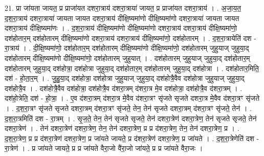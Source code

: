 \documentclass[17pt]{extarticle}
\begin{document}
21. प्रा जा॑यता जायत॒ प्र प्राजा॑यत दशरा॒त्राय॑ दशरा॒त्राया॑ जायत॒ प्र प्राजा॑यत दशरा॒त्राय॑ । . अ॒जा॒य॒त॒ द॒श॒रा॒त्राय॑ दशरा॒त्राया॑ जायता जायत दशरा॒त्राय॑ दीक्षि॒ष्यमा॑णो दीक्षि॒ष्यमा॑णो दशरा॒त्राया॑ जायता जायत दशरा॒त्राय॑ दीक्षि॒ष्यमा॑णः । . द॒श॒रा॒त्राय॑ दीक्षि॒ष्यमा॑णो दीक्षि॒ष्यमा॑णो दशरा॒त्राय॑ दशरा॒त्राय॑ दीक्षि॒ष्यमा॑णो॒ दश॑होतार॒म् दश॑होतारम् दीक्षि॒ष्यमा॑णो दशरा॒त्राय॑ दशरा॒त्राय॑ दीक्षि॒ष्यमा॑णो॒ दश॑होतारम् । . द॒श॒रा॒त्रायेति॑ दश - रा॒त्राय॑ । . दी॒क्षि॒ष्यमा॑णो॒ दश॑होतार॒म् दश॑होतारम् दीक्षि॒ष्यमा॑णो दीक्षि॒ष्यमा॑णो॒ दश॑होतारम् जुहुयाज् जुहुया॒द् दश॑होतारम् दीक्षि॒ष्यमा॑णो दीक्षि॒ष्यमा॑णो॒ दश॑होतारम् जुहुयात् । . दश॑होतारम् जुहुयाज् जुहुया॒द् दश॑होतार॒म् दश॑होतारम् जुहुया॒द् दश॑होत्रा॒ दश॑होत्रा जुहुया॒द् दश॑होतार॒म् दश॑होतारम् जुहुया॒द् दश॑होत्रा । . दश॑होतार॒मिति॒ दश॑ - हो॒ता॒र॒म् । . जु॒हु॒या॒द् दश॑होत्रा॒ दश॑होत्रा जुहुयाज् जुहुया॒द् दश॑होत्रै॒वैव दश॑होत्रा जुहुयाज् जुहुया॒द् दश॑होत्रै॒व । . दश॑होत्रै॒वैव दश॑होत्रा॒ दश॑होत्रै॒व द॑शरा॒त्रम् द॑शरा॒त्र मे॒व दश॑होत्रा॒ दश॑होत्रै॒व द॑शरा॒त्रम् । . दश॑हो॒त्रेति॒ दश॑ - हो॒त्रा॒ । . ए॒व द॑शरा॒त्रम् द॑शरा॒त्र मे॒वैव द॑शरा॒त्रꣳ सृ॑जते सृजते दशरा॒त्र मे॒वैव द॑शरा॒त्रꣳ सृ॑जते । . द॒श॒रा॒त्रꣳ सृ॑जते सृजते दशरा॒त्रम् द॑शरा॒त्रꣳ सृ॑जते॒ तेन॒ तेन॑ सृजते दशरा॒त्रम् द॑शरा॒त्रꣳ सृ॑जते॒ तेन॑ । . द॒श॒रा॒त्रमिति॑ दश - रा॒त्रम् । . सृ॒ज॒ते॒ तेन॒ तेन॑ सृजते सृजते॒ तेन॑ दशरा॒त्रेण॑ दशरा॒त्रेण॒ तेन॑ सृजते सृजते॒ तेन॑ दशरा॒त्रेण॑ । . तेन॑ दशरा॒त्रेण॑ दशरा॒त्रेण॒ तेन॒ तेन॑ दशरा॒त्रेण॒ प्र प्र द॑शरा॒त्रेण॒ तेन॒ तेन॑ दशरा॒त्रेण॒ प्र । . द॒श॒रा॒त्रेण॒ प्र प्र द॑शरा॒त्रेण॑ दशरा॒त्रेण॒ प्र जा॑यते जायते॒ प्र द॑शरा॒त्रेण॑ दशरा॒त्रेण॒ प्र जा॑यते । . द॒श॒रा॒त्रेणेति॑ दश - रा॒त्रेण॑ । . प्र जा॑यते जायते॒ प्र प्र जा॑यते वैरा॒जो वै॑रा॒जो जा॑यते॒ प्र प्र जा॑यते वैरा॒जः । \newline
\end{document}
